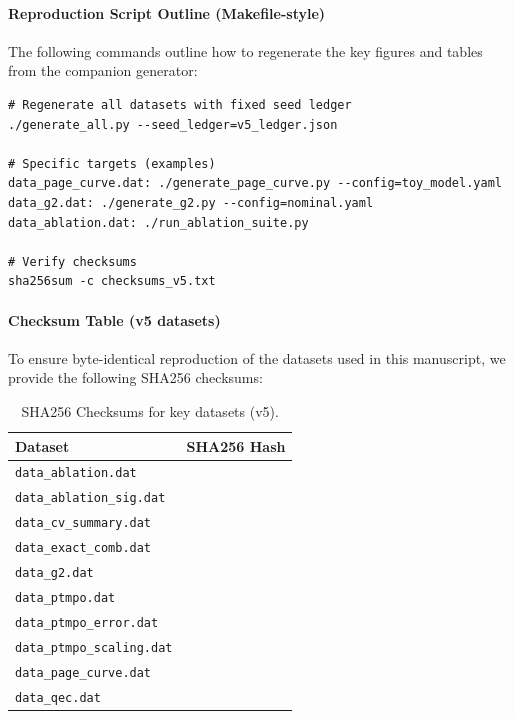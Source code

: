\documentclass[a4paper,11pt]{article}
\theoremstyle{plain}
\theoremstyle{definition}
\theoremstyle{remark}
\begin{document}
\paragraph{Reproduction Script Outline (Makefile-style)}
The following commands outline how to regenerate the key figures and tables from the companion generator:
\begin{verbatim}
# Regenerate all datasets with fixed seed ledger
./generate_all.py --seed_ledger=v5_ledger.json

# Specific targets (examples)
data_page_curve.dat: ./generate_page_curve.py --config=toy_model.yaml
data_g2.dat: ./generate_g2.py --config=nominal.yaml
data_ablation.dat: ./run_ablation_suite.py

# Verify checksums
sha256sum -c checksums_v5.txt
\end{verbatim}

\paragraph{Checksum Table (v5 datasets)}
To ensure byte-identical reproduction of the datasets used in this manuscript, we provide the following SHA256 checksums:
\begin{table}[htbp]
\centering
\caption{SHA256 Checksums for key datasets (v5).}
\label{tab:checksums}
\footnotesize
\begin{tabularx}{\textwidth}{@{}T T@{}}
\toprule
\textbf{Dataset} & \textbf{SHA256 Hash} \\
\midrule
\texttt{data\_ablation.dat} &  \\
\texttt{data\_ablation\_sig.dat} &  \\
\texttt{data\_cv\_summary.dat} &  \\
\texttt{data\_exact\_comb.dat} &  \\
\texttt{data\_g2.dat} &  \\
\texttt{data\_ptmpo.dat} &  \\
\texttt{data\_ptmpo\_error.dat} &  \\
\texttt{data\_ptmpo\_scaling.dat} &  \\
\texttt{data\_page\_curve.dat} &  \\
\texttt{data\_qec.dat} &  \\
\bottomrule
\end{tabularx}
\end{table}
\end{document}
